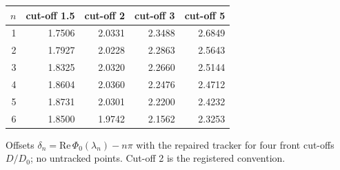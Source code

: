 \begin{tabular}{rrrrr}
\toprule
$n$ & cut-off 1.5 & cut-off 2 & cut-off 3 & cut-off 5\\
\midrule
1 & 1.7506 & 2.0331 & 2.3488 & 2.6849\\
2 & 1.7927 & 2.0228 & 2.2863 & 2.5643\\
3 & 1.8325 & 2.0320 & 2.2660 & 2.5144\\
4 & 1.8604 & 2.0360 & 2.2476 & 2.4712\\
5 & 1.8731 & 2.0301 & 2.2200 & 2.4232\\
6 & 1.8500 & 1.9742 & 2.1562 & 2.3253\\
\bottomrule
\end{tabular}

\smallskip\par\footnotesize Offsets $\delta_n=\mathrm{Re}\,\Phi_0(\lambda_n)-n\pi$ with the repaired tracker for four front cut-offs $D/D_0$; no untracked points. Cut-off 2 is the registered convention.
